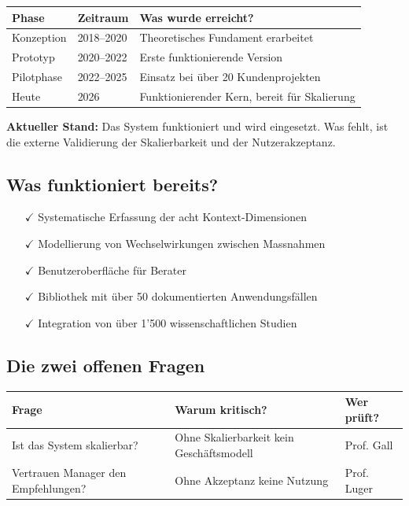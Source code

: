 \documentclass[11pt,a4paper]{article}
\begin{document}
\begin{table}[h]
\centering
\begin{tabular}{@{}L{3cm}L{3cm}L{7cm}@{}}
\toprule
\textbf{Phase} & \textbf{Zeitraum} & \textbf{Was wurde erreicht?} \\
\midrule
Konzeption & 2018--2020 & Theoretisches Fundament erarbeitet \\
Prototyp & 2020--2022 & Erste funktionierende Version \\
Pilotphase & 2022--2025 & Einsatz bei über 20 Kundenprojekten \\
Heute & 2026 & Funktionierender Kern, bereit für Skalierung \\
\bottomrule
\end{tabular}
\end{table}

\textbf{Aktueller Stand:} Das System funktioniert und wird eingesetzt. Was fehlt, ist die externe Validierung der Skalierbarkeit und der Nutzerakzeptanz.

\subsection{Was funktioniert bereits?}

\begin{itemize}
    \item[$\checkmark$] Systematische Erfassung der acht Kontext-Dimensionen
    \item[$\checkmark$] Modellierung von Wechselwirkungen zwischen Massnahmen
    \item[$\checkmark$] Benutzeroberfläche für Berater
    \item[$\checkmark$] Bibliothek mit über 50 dokumentierten Anwendungsfällen
    \item[$\checkmark$] Integration von über 1'500 wissenschaftlichen Studien
\end{itemize}

\subsection{Die zwei offenen Fragen}

\begin{table}[h]
\centering
\begin{tabular}{@{}L{5cm}L{5cm}L{3cm}@{}}
\toprule
\textbf{Frage} & \textbf{Warum kritisch?} & \textbf{Wer prüft?} \\
\midrule
Ist das System skalierbar? & Ohne Skalierbarkeit kein Geschäftsmodell & Prof. Gall \\
Vertrauen Manager den Empfehlungen? & Ohne Akzeptanz keine Nutzung & Prof. Luger \\
\bottomrule
\end{tabular}
\end{table}
\end{document}

